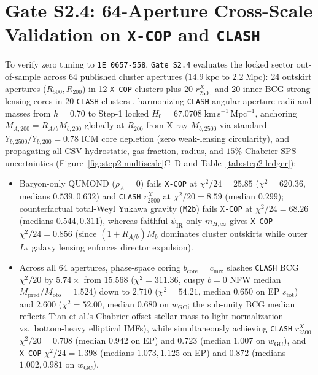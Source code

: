 \documentclass[11pt,a4paper]{article}
\begin{document}
\section{\texorpdfstring{Gate S2.4: 64-Aperture Cross-Scale Validation on \texttt{X-COP} and \texttt{CLASH}}{Gate S2.4: 64-Aperture Cross-Scale Validation on X-COP and CLASH}}
\label{sec:step2-xcop}
To verify zero tuning to \texttt{1E~0657-558}, \texttt{Gate S2.4} evaluates the locked sector out-of-sample across 64 published cluster apertures ($14.9\;\mathrm{kpc}$ to $2.2\;\mathrm{Mpc}$): 24 outskirt apertures ($R_{500}, R_{200}$) in 12 \texttt{X-COP} clusters \cite{Eckert2019} plus 20 $r_{2500}^X$ and 20 inner BCG strong-lensing cores in 20 \texttt{CLASH} clusters \cite{Donahue2014,Umetsu2016,Tian2020}, harmonizing \texttt{CLASH} angular-aperture radii and masses from $h = 0.70$ to Step-1 locked $H_0 = 67.0708\;\mathrm{km\,s^{-1}\,Mpc^{-1}}$, anchoring $M_{A,200} = R_{A/b}M_{b,200}$ globally at $R_{200}$ from X-ray $M_{b,2500}$ via standard $Y_{b,2500}/Y_{b,200} = 0.78$ ICM core depletion \cite{Planelles2013,Eckert2019} (zero weak-lensing circularity), and propagating all CSV hydrostatic, gas-fraction, radius, and $15\%$ Chabrier SPS uncertainties (Figure~\ref{fig:step2-multiscale}C--D and Table~\ref{tab:step2-ledger}):
\begin{itemize}
    \item Baryon-only QUMOND ($\rho_A = 0$) fails \texttt{X-COP} at $\chi^2/24 = 25.85$ ($\chi^2 = 620.36$, medians $0.539, 0.632$) and \texttt{CLASH} $r_{2500}^X$ at $\chi^2/20 = 8.59$ (median $0.299$); counterfactual total-Weyl Yukawa gravity (\texttt{M2b}) fails \texttt{X-COP} at $\chi^2/24 = 68.26$ (medians $0.544, 0.311$), whereas faithful $\psi_{\mathrm{IR}}$-only $m_{H,\infty}$ gives \texttt{X-COP} $\chi^2/24 = 0.856$ (since $(1+R_{A/b})M_b$ dominates cluster outskirts while outer $L_*$ galaxy lensing enforces director expulsion).
    \item Across all 64 apertures, phase-space coring $b_{\mathrm{core}} = c_{\mathrm{mix}}$ slashes \texttt{CLASH} BCG $\chi^2/20$ by $5.74\times$ from $15.568$ ($\chi^2 = 311.36$, cuspy $b=0$ NFW median $M_{\mathrm{pred}}/M_{\mathrm{obs}} = 1.524$) down to $\mathbf{2.710}$ ($\chi^2 = 54.21$, median $0.650$ on EP $s_{\mathrm{tot}}$) and $\mathbf{2.600}$ ($\chi^2 = 52.00$, median $0.680$ on $w_{\mathrm{GC}}$; the sub-unity BCG median reflects Tian et al.'s \cite{Tian2020} Chabrier-offset stellar mass-to-light normalization vs.\ bottom-heavy elliptical IMFs), while simultaneously achieving \texttt{CLASH} $r_{2500}^X$ $\chi^2/20 = \mathbf{0.708}$ (median $0.942$ on EP) and $\mathbf{0.723}$ (median $1.007$ on $w_{\mathrm{GC}}$), and \texttt{X-COP} $\chi^2/24 = \mathbf{1.398}$ (medians $1.073, 1.125$ on EP) and $\mathbf{0.872}$ (medians $1.002, 0.981$ on $w_{\mathrm{GC}}$).
\end{itemize}
\end{document}
